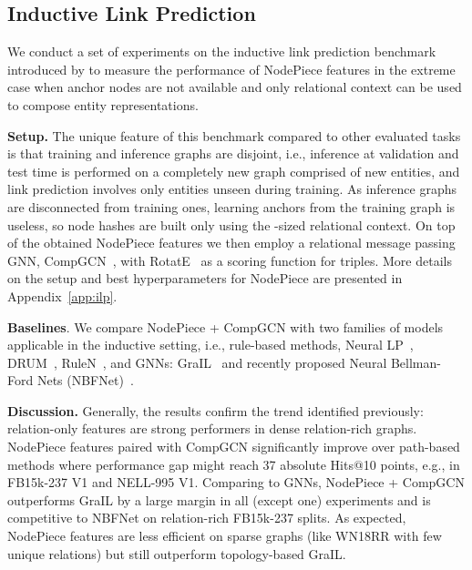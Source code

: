 \documentclass{article} \usepackage{iclr2022_conference,times}
\begin{document}
\subsection{Inductive Link Prediction}


We conduct a set of experiments on the inductive link prediction benchmark introduced by \citet{DBLP:conf/icml/TeruDH20} to measure the performance of NodePiece features in the extreme case when anchor nodes are not available and only relational context can be used to compose entity representations.

\textbf{Setup.} 
The unique feature of this benchmark compared to other evaluated tasks is that training and inference graphs are disjoint, i.e., inference at validation and test time is performed on a completely new graph comprised of new entities, and link prediction involves only entities unseen during training. 
As inference graphs are disconnected from training ones, learning anchors from the training graph is useless, so node hashes are built only using the -sized relational context. 
On top of the obtained NodePiece features we then employ a relational message passing GNN, CompGCN~\citep{Vashishth2020Composition-based}, with RotatE~\citep{DBLP:conf/iclr/SunDNT19} as a scoring function for triples. 
More details on the setup and best hyperparameters for NodePiece are presented in Appendix~\ref{app:ilp}.

\textbf{Baselines}. We compare NodePiece + CompGCN with two families of models applicable in the inductive setting, i.e., rule-based methods, Neural LP~\citep{DBLP:conf/nips/YangYC17}, DRUM~\citep{DBLP:conf/nips/SadeghianADW19}, RuleN~\citep{DBLP:conf/semweb/MeilickeFWRGS18}, and GNNs: GraIL~\citep{DBLP:conf/icml/TeruDH20} and recently proposed Neural Bellman-Ford Nets (NBFNet)~\citep{zhu2021neural}.

\textbf{Discussion.} 
Generally, the results confirm the trend identified previously: relation-only features are strong performers in dense relation-rich graphs. 
NodePiece features paired with CompGCN significantly improve over path-based methods where performance gap might reach 37 absolute Hits@10 points, e.g., in FB15k-237 V1 and NELL-995 V1. 
Comparing to GNNs, NodePiece + CompGCN outperforms GraIL by a large margin in all (except one) experiments and is competitive to NBFNet on relation-rich FB15k-237 splits.
As expected, NodePiece features are less efficient on sparse graphs (like WN18RR with few unique relations) but still outperform topology-based GraIL.
\end{document}
